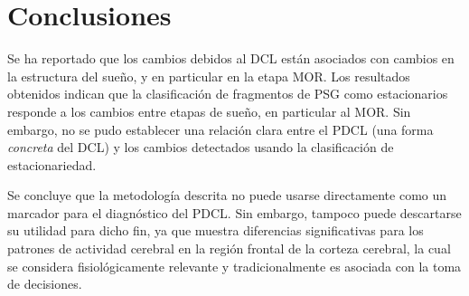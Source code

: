 \documentclass[12pt,letterpaper]{book}
\begin{document}
%


\section{Conclusiones}

Se ha reportado que los cambios debidos al DCL están asociados con cambios en la estructura del sueño, y en particular en la etapa MOR.
%
Los resultados obtenidos indican que la clasificación de fragmentos de PSG como estacionarios responde a los cambios entre etapas de sueño, en particular al MOR.
%
Sin embargo, no se pudo establecer una relación clara entre el PDCL (una forma \textit{concreta} del DCL) y los cambios detectados usando la clasificación de estacionariedad.

Se concluye que la metodología descrita no puede usarse directamente como un marcador para el diagnóstico del PDCL.
%
Sin embargo, tampoco puede descartarse su utilidad para dicho fin, ya que muestra diferencias significativas para los patrones de actividad cerebral en la región frontal de la corteza cerebral, la cual se considera fisiológicamente relevante y tradicionalmente es asociada con la toma de decisiones.
\end{document}

